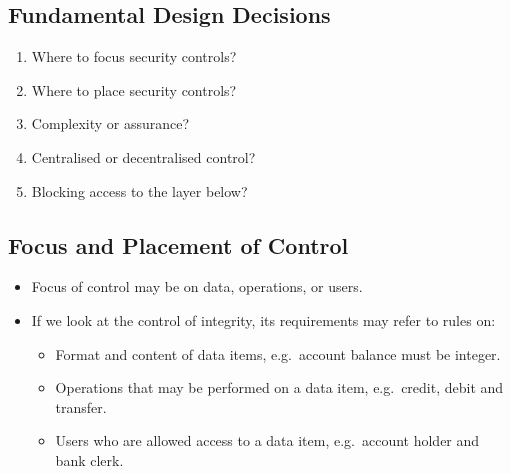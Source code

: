 \documentclass{beamer}
\begin{document}
\subsection{Fundamental Design Decisions}

\begin{frame}
  \begin{enumerate}
    \item Where to focus security controls?
    \item Where to place security controls?
    \item Complexity or assurance?
    \item Centralised or decentralised control?
    \item Blocking access to the layer below?
  \end{enumerate}
\end{frame}

\subsection{Focus and Placement of Control}

\begin{frame}
  \begin{itemize}
    \item Focus of control may be on data, operations, or users.

    \item If we look at the control of integrity, its requirements may refer to 
      rules on:
      \begin{itemize}
        \item Format and content of data items, e.g.~account balance must be 
          integer.

        \item Operations that may be performed on a data item, e.g.~credit, 
          debit and transfer.

        \item Users who are allowed access to a data item, e.g.~account holder 
          and bank clerk.
      \end{itemize}
  \end{itemize}
\end{frame}

\end{document}
